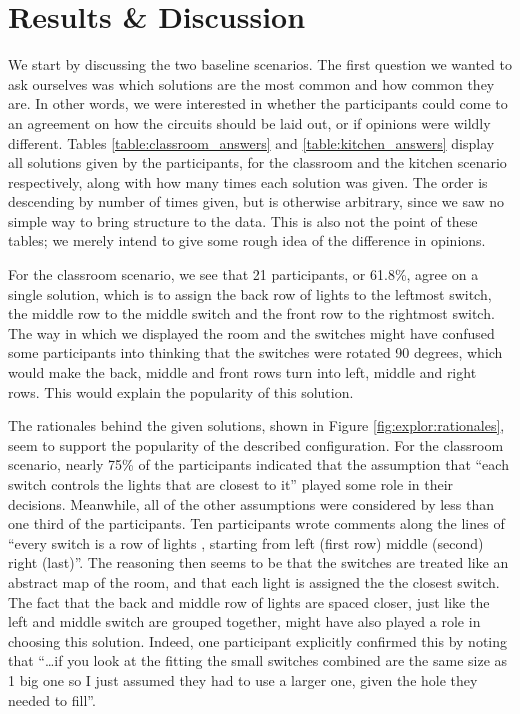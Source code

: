 \section{Results \& Discussion} \label{sec:explor:res_disc}
We start by discussing the two baseline scenarios. The first question we wanted to ask ourselves was which solutions are the most common and how common they are. In other words, we were interested in whether the participants could come to an agreement on how the circuits should be laid out, or if opinions were wildly different. Tables \ref{table:classroom_answers} and \ref{table:kitchen_answers} display all solutions given by the participants, for the classroom and the kitchen scenario respectively, along with how many times each solution was given. The order is descending by number of times given, but is otherwise arbitrary, since we saw no simple way to bring structure to the data. This is also not the point of these tables; we merely intend to give some rough idea of the difference in opinions.

For the classroom scenario, we see that 21 participants, or 61.8\%, agree on a single solution, which is to assign the back row of lights to the leftmost switch, the middle row to the middle switch and the front row to the rightmost switch. The way in which we displayed the room and the switches might have confused some participants into thinking that the switches were rotated 90 degrees, which would make the back, middle and front rows turn into left, middle and right rows. This would explain the popularity of this solution.

The rationales behind the given solutions, shown in Figure \ref{fig:explor:rationales}, seem to support the popularity of the described configuration. For the classroom scenario, nearly 75\% of the participants indicated that the assumption that ``each switch controls the lights that are closest to it'' played some role in their decisions. Meanwhile, all of the other assumptions were considered by less than one third of the participants. Ten participants wrote comments along the lines of ``every switch is a row of lights , starting from left (first row) middle (second) right (last)''. The reasoning then seems to be that the switches are treated like an abstract map of the room, and that each light is assigned the the closest switch. The fact that the back and middle row of lights are spaced closer, just like the left and middle switch are grouped together, might have also played a role in choosing this solution. Indeed, one participant explicitly confirmed this by noting that ``\ldots if you look at the fitting the small switches combined are the same size as 1 big one so I just assumed they had to use a larger one, given the hole they needed to fill''.

